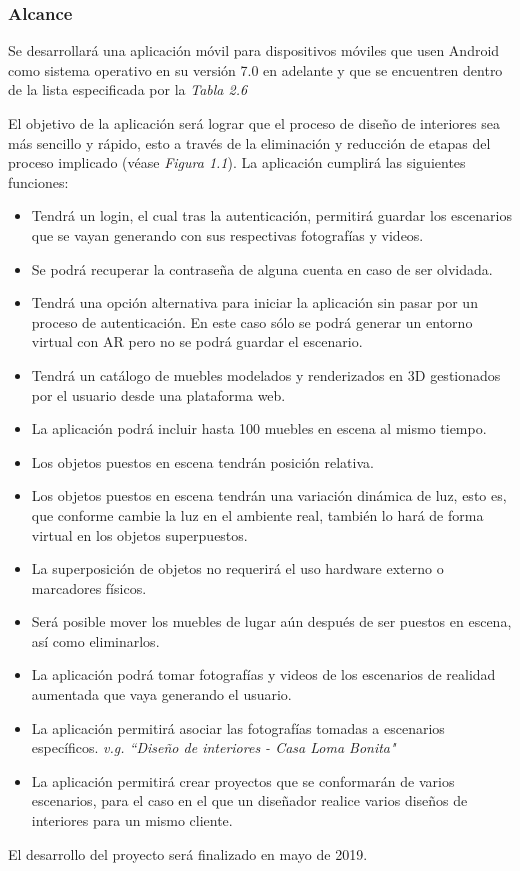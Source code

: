 \subsubsection{Alcance}
Se desarrollará una aplicación móvil para dispositivos móviles que usen Android como sistema operativo en su versión 7.0 en adelante y que se encuentren dentro de la lista especificada por la \textit{Tabla 2.6}\par
El objetivo de la aplicación será lograr que el proceso de diseño de interiores sea más sencillo y rápido, esto a través de la eliminación y reducción de etapas del proceso implicado (véase \textit{Figura 1.1}).
La aplicación cumplirá las siguientes funciones:\par
\begin{itemize}
	\item Tendrá un login, el cual tras la autenticación, permitirá guardar los escenarios que se vayan generando con sus respectivas fotografías y videos.
	\item Se podrá recuperar la contraseña de alguna cuenta en caso de ser olvidada.
	\item Tendrá una opción alternativa para iniciar la aplicación sin pasar por un proceso de autenticación. En este caso sólo se podrá generar un entorno virtual con AR pero no se podrá guardar el escenario.
	\item Tendrá un catálogo de muebles modelados y renderizados en 3D gestionados por el usuario desde una plataforma web.
	\item La aplicación podrá incluir hasta 100 muebles en escena al mismo tiempo.
	\item Los objetos puestos en escena tendrán posición relativa.
	\item Los objetos puestos en escena tendrán una variación dinámica de luz, esto es, que conforme cambie la luz en el ambiente real, también lo hará de forma virtual en los objetos superpuestos.
	\item La superposición de objetos no requerirá el uso hardware externo o marcadores físicos.
	\item Será posible mover los muebles de lugar aún después de ser puestos en escena, así como eliminarlos.
	\item La aplicación podrá tomar fotografías y videos de los escenarios de realidad aumentada que vaya generando el usuario.
	\item La aplicación permitirá asociar las fotografías tomadas a escenarios específicos. \textit{v.g. ``Diseño de interiores - Casa Loma Bonita"}
	\item La aplicación permitirá crear proyectos que se conformarán de varios escenarios, para el caso en el que un diseñador realice varios diseños de interiores para un mismo cliente.
\end{itemize}
\noindent
El desarrollo del proyecto será finalizado en mayo de 2019.
